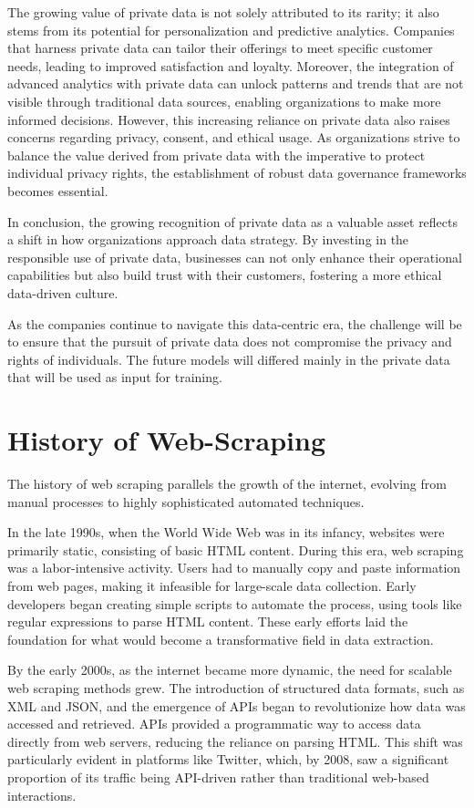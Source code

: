 The growing value of private data is not solely attributed to its rarity; it also stems from its potential for personalization and predictive analytics. Companies that harness private data can tailor their offerings to meet specific customer needs, leading to improved satisfaction and loyalty. Moreover, the integration of advanced analytics with private data can unlock patterns and trends that are not visible through traditional data sources, enabling organizations to make more informed decisions. However, this increasing reliance on private data also raises concerns regarding privacy, consent, and ethical usage. As organizations strive to balance the value derived from private data with the imperative to protect individual privacy rights, the establishment of robust data governance frameworks becomes essential. 

In conclusion, the growing recognition of private data as a valuable asset reflects a shift in how organizations approach data strategy. By investing in the responsible use of private data, businesses can not only enhance their operational capabilities but also build trust with their customers, fostering a more ethical data-driven culture. 

As the companies continue to navigate this data-centric era, the challenge will be to ensure that the pursuit of private data does not compromise the privacy and rights of individuals. The future models will differed mainly in the private data that will be used as input for training.

\clearpage 
\section{History of Web-Scraping}

The history of web scraping parallels the growth of the internet, evolving from manual processes to highly sophisticated automated techniques. 

In the late 1990s, when the World Wide Web was in its infancy, websites were primarily static, consisting of basic HTML content. During this era, web scraping was a labor-intensive activity. Users had to manually copy and paste information from web pages, making it infeasible for large-scale data collection. Early developers began creating simple scripts to automate the process, using tools like regular expressions to parse HTML content. These early efforts laid the foundation for what would become a transformative field in data extraction.

By the early 2000s, as the internet became more dynamic, the need for scalable web scraping methods grew. The introduction of structured data formats, such as XML and JSON, and the emergence of APIs began to revolutionize how data was accessed and retrieved. APIs provided a programmatic way to access data directly from web servers, reducing the reliance on parsing HTML. This shift was particularly evident in platforms like Twitter, which, by 2008, saw a significant proportion of its traffic being API-driven rather than traditional web-based interactions. 

